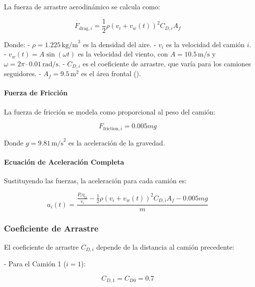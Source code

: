 \documentclass[11pt,stdletter,orderfromtodate,sigleft,twoside]{report}
\begin{document}
La fuerza de arrastre aerodinámico se calcula como:

\begin{equation}
F_{\text{drag},i} = \frac{1}{2} \rho (v_i + v_w(t))^2 C_{D,i} A_f
\end{equation}

Donde:
- $\rho = 1.225 \, \text{kg/m}^3$ es la densidad del aire.
- $v_i$ es la velocidad del camión $i$.
- $v_w(t) = A \sin(\omega t)$ es la velocidad del viento, con $A = 10.5 \, \text{m/s}$ y $\omega = 2\pi \cdot 0.01 \, \text{rad/s}$.
- $C_{D,i}$ es el coeficiente de arrastre, que varía para los camiones seguidores.
- $A_f = 9.5 \, \text{m}^2$ es el área frontal (\cite{AreaFrontal}).

\paragraph{Fuerza de Fricción}

La fuerza de fricción se modela como proporcional al peso del camión:

\begin{equation}
F_{\text{friction},i} = 0.005 m g
\end{equation}

Donde $g = 9.81 \, \text{m/s}^2$ es la aceleración de la gravedad.

\paragraph{Ecuación de Aceleración Completa}

Sustituyendo las fuerzas, la aceleración para cada camión es:

\begin{equation}
a_i(t) = \frac{\frac{P_i \eta_{\text{tr}}}{v_i} - \frac{1}{2} \rho (v_i + v_w(t))^2 C_{D,i} A_f - 0.005 m g}{m}
\end{equation}

\subsubsection{Coeficiente de Arrastre}

El coeficiente de arrastre $C_{D,i}$ depende de la distancia al camión precedente:

- Para el Camión 1 ($i=1$):

\begin{equation}
C_{D,1} = C_{D0} = 0.7
\end{equation}
\end{document}
